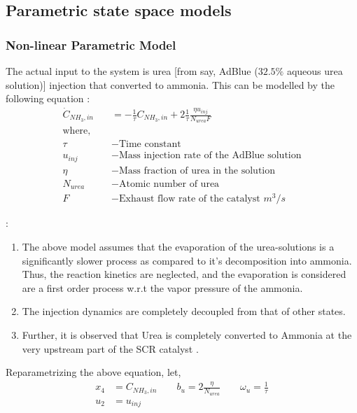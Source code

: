 \subsection{Parametric state space models}

\subsubsection{Non-linear Parametric Model}
The actual input to the system is urea [from say, AdBlue ($32.5\%$ aqueous urea
solution)] injection that converted to ammonia. This can be modelled by the following equation \cite{nova2014urea}:
\begin{align*}
    \dot C_{NH_3, in} &= - \frac{1}{\tau} C_{NH_3, in} + 2 \frac{1}{\tau} \frac{ \eta u_{inj}}{N_{urea} F}\\
    \text{where, } \quad &\\
    \tau &- \text{Time constant}\\
    u_{inj} &- \text{Mass injection rate of the AdBlue solution}\\
    \eta &- \text{Mass fraction of urea in the solution}\\
    N_{urea} &- \text{Atomic number of urea}\\
    F &- \text{Exhaust flow rate of the catalyst } m^3/s
\end{align*}

:
\begin{enumerate}
    \item The above model assumes that the evaporation of the urea-solutions is a significantly slower process as
        compared to it's decomposition into ammonia. Thus, the reaction
        kinetics are neglected, and the evaporation is considered are a first
        order process w.r.t the vapor pressure of the ammonia.
    \item The injection dynamics are completely decoupled from that of other
        states.
    \item Further, it is observed that Urea is completely converted to Ammonia
        at the very upstream part of the SCR catalyst
        \cite{hsieh2011development}.
\end{enumerate}

Reparametrizing the above equation, let,
\begin{align*}
    x_4 &= C_{NH_3, in} \qquad b_u = 2 \frac{ \eta}{N_{urea}} \qquad \omega_u = \frac{1}{\tau}\\
    u_2 &= u_{inj}
\end{align*}

